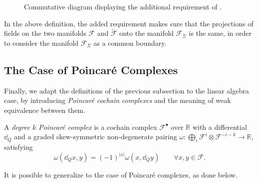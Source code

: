 \begin{figure}
    \centering
    
    \caption{Commutative diagram displaying the additional requirement of .}
    \label{fig:weak_equiv}
\end{figure}

In the above definition, the added requirement makes sure that the projections of fields on the two manifolds $\mathcal{F}$ and $\widetilde{\mathcal{F}}$ onto the manifold $\mathcal{F}_\Sigma$ is the same, in order to consider the manifold $\mathcal{F}_\Sigma$ as a common boundary.

\subsection{The Case of Poincaré Complexes}
\label{subsec:Poincaré_complex_case}

Finally, we adapt the definitions of the previous subsection to the linear algebra case, by introducing \emph{Poincaré cochain complexes} and the meaning of weak equivalence between them.

\begin{definition}
    A \emph{degree $k$ Poincaré complex} is a cochain complex $\mathcal{F}^\bullet$ over $\mathbb{R}$ with a differential $\dd_Q$ and a graded skew-symmetric non-degenerate pairing $\omega : \bigoplus_i \mathcal{F}^i \otimes \mathcal{F}^{-i-k} \rightarrow \mathbb{R}$, satisfying
    \begin{equation*}
        \omega(\dd_Q x, y) = (-1)^{|x|} \omega (x, \dd_Q y) \qquad \forall x, y \in \mathcal{F} .
    \end{equation*}
\end{definition}

It is possible to generalize  to the case of Poincaré complexes, as done below.


